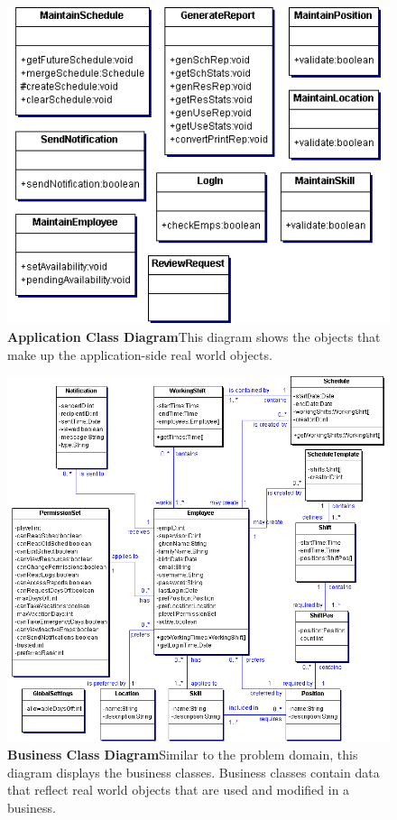 \documentclass[letterpaper,12pt]{report}
\begin{document}
\newpage
\begin{figure}[applicationClassDia]
 \centering
 \includegraphics[scale=0.8]{externals/ApplicationClassDiagram.png}
 \caption{\small
\textbf{Application Class Diagram}\newline This diagram shows the objects that make up the application-side real world objects.}\label{fig:pdclassdia}
\end{figure}
\newpage
\begin{figure}[businessClassDia]
 \centering
 \includegraphics[scale=0.8]{externals/BusinessClassDiagram.png}
 \caption{\small
\textbf{Business Class Diagram}\newline Similar to the problem domain, this diagram displays the business classes. Business classes contain data that reflect real world objects that are used and modified in a business.}\label{fig:buisclassdia}
\end{figure}
\newpage
\end{document}
